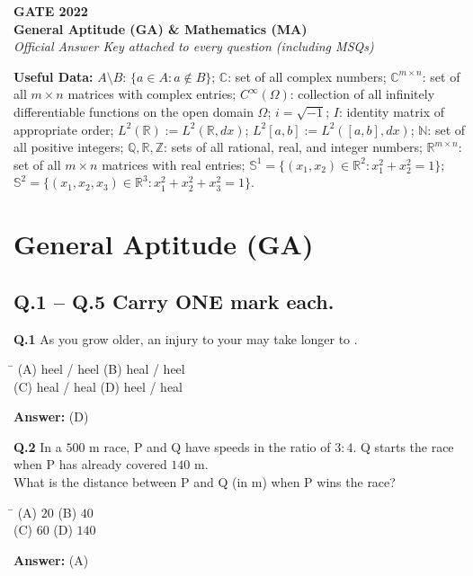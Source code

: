 \documentclass[11pt,a4paper]{article}
\newcommand{\optsfourA}[4]{%
  \begin{tabbing}
    \hspace{0.48\linewidth}\=\kill
    (A) #1 \> (B) #2 \\[2pt]
    (C) #3 \> (D) #4
  \end{tabbing}%
}
\newcommand{\ans}[1]{\textbf{Answer:} #1\par\medskip}
\begin{document}
\newpage


\begin{center}
  {\LARGE\bfseries GATE 2022}\\[4pt]
  {\large\bfseries General Aptitude (GA) \& Mathematics (MA)}\\[2pt]
  {\small\itshape Official Answer Key attached to every question (including MSQs)}
\end{center}
\medskip

\textbf{Useful Data:}
$A \setminus B$: $\{a \in A : a \notin B\}$; $\mathbb{C}$: set of all complex numbers; $\mathbb{C}^{m \times n}$: set of all $m \times n$ matrices with complex entries; $C^\infty(\Omega)$: collection of all infinitely differentiable functions on the open domain $\Omega$; $i = \sqrt{-1}$; $I$: identity matrix of appropriate order; $L^2(\mathbb{R}) := L^2(\mathbb{R}, dx)$; $L^2[a, b] := L^2([a, b], dx)$; $\mathbb{N}$: set of all positive integers; $\mathbb{Q}, \mathbb{R}, \mathbb{Z}$: sets of all rational, real, and integer numbers; $\mathbb{R}^{m \times n}$: set of all $m \times n$ matrices with real entries; $\mathbb{S}^1 = \{(x_1, x_2) \in \mathbb{R}^2 : x_1^2 + x_2^2 = 1\}$; $\mathbb{S}^2 = \{(x_1, x_2, x_3) \in \mathbb{R}^3 : x_1^2 + x_2^2 + x_3^2 = 1\}$.

\section*{General Aptitude (GA)}

\subsection*{Q.1 -- Q.5 Carry ONE mark each.}

\textbf{Q.1} As you grow older, an injury to your \underline{\hspace{2cm}} may take longer to \underline{\hspace{2cm}}.
\optsfourA{heel / heel}{heal / heel}{heal / heal}{heel / heal}
\ans{(D)}

\textbf{Q.2} In a $500\text{ m}$ race, P and Q have speeds in the ratio of $3 : 4$. Q starts the race when P has already covered $140\text{ m}$.\\
What is the distance between P and Q (in $\text{m}$) when P wins the race?
\optsfourA{$20$}{$40$}{$60$}{$140$}
\ans{(A)}
\end{document}
